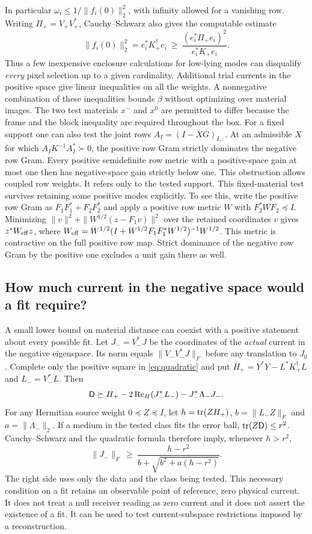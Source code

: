 In particular $\omega_i\le1/\|f_i(0)\|_2^2$, with infinity allowed for a vanishing row. Writing $\Pi_+=V_+V_+^*$, Cauchy--Schwarz also gives the computable estimate
\[
 \|f_i(0)\|_2^2=e_i^*K_+^\dagger e_i
 \ \ge\ \frac{(e_i^*\Pi_+e_i)^2}{e_i^*K_+e_i}.
\]
Thus a few inexpensive enclosure calculations for low-lying modes can disqualify \emph{every} pixel selection up to a given cardinality. Additional trial currents in the positive space give linear inequalities on all the weights. A nonnegative combination of these inequalities bounds $\beta$ without optimizing over material images. The two test materials $x^-$ and $x^0$ are permitted to differ because the frame and the block inequality are required throughout the box.
For a fixed support one can also test the joint rows $A_I=(I-XG)_{I,:}$. At an admissible $X$ for which $A_I K^{-1}A_I^*\succ0$, the positive row Gram strictly dominates the negative row Gram. Every positive semidefinite row metric with a positive-space gain at most one then has negative-space gain strictly below one. This obstruction allows coupled row weights. It refers only to the tested support. This fixed-material test survives retaining some positive modes explicitly. To see this, write the positive row Gram as $F_1F_1^*+F_2F_2^*$ and apply a positive row metric $W$ with $F_2^*WF_2\preceq I$. Minimizing $\|v\|^2+\|W^{1/2}(z-F_1v)\|^2$ over the retained coordinates $v$ gives $z^*W_{\rm eff}z$, where $W_{\rm eff}=W^{1/2}(I+W^{1/2}F_1F_1^*W^{1/2})^{-1}W^{1/2}$. This metric is contractive on the full positive row map. Strict dominance of the negative row Gram by the positive one excludes a unit gain there as well.

\subsection{How much current in the negative space would a fit require?}\label{sec:necessary}

A small lower bound on material distance can coexist with a positive statement about every possible fit. Let $J_-=V_-^*J$ be the coordinates of the \emph{actual} current in the negative eigenspace. Its norm equals $\|V_-V_-^*J\|_F$ before any translation to $J_0$. Complete only the positive square in \eqref{eq:quadratic} and put $H_+=Y^*Y-L^*K_+^\dagger L$ and $L_-=V_-^*L$. Then
\[
 \mathsf D\succeq H_+-2\operatorname{Re}_{H}(J_-^*L_-)-J_-^*\Lambda_- J_- .
\]
For any Hermitian source weight $0\preceq Z\preceq I$, let $h=\operatorname{tr}(ZH_+)$, $b=\|L_-Z\|_F$ and $a=\|\Lambda_-\|_2$. If a medium in the tested class fits the error ball, $\operatorname{tr}(Z\mathsf D)\le r^2$. Cauchy--Schwarz and the quadratic formula therefore imply, whenever $h>r^2$,
\begin{equation}
 \|J_-\|_F\ \ge\
 \frac{h-r^2}{b+\sqrt{b^2+a(h-r^2)}} .                   \label{eq:required}
\end{equation}
The right side uses only the data and the class being tested. This necessary condition on a fit retains an observable point of reference, zero physical current. It does not treat a null receiver reading as zero current and it does not assert the existence of a fit. It can be used to test current-subspace restrictions imposed by a reconstruction.

